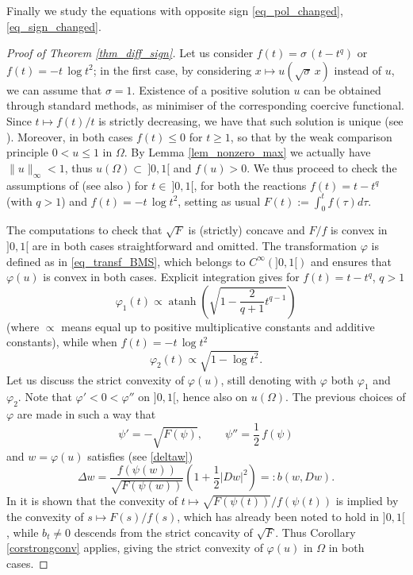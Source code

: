 \documentclass[12pt]{amsart}
\numberwithin{equation}{section}
\theoremstyle{plain}
\theoremstyle{plain}
\theoremstyle{plain}
\theoremstyle{definition}
\begin{document}
Finally we study the equations with opposite sign \eqref{eq_pol_changed}, \eqref{eq_sign_changed}.
\begin{proof}[Proof of Theorem \ref{thm_diff_sign}]
Let us consider $f(t) = \sigma\, (t-t^q)$ or $f(t)=-t \, \log t^2$; in the first case, by considering $x\mapsto u(\sqrt{\sigma}\, x)$ instead of $u$, we can assume that $\sigma=1$. 
Existence of a positive solution $u$ can be obtained through standard methods, as minimiser of the corresponding coercive functional. Since $t \mapsto f(t)/t$ is strictly decreasing, we have that such solution is unique (see \cite{BrOs86}). 
Moreover, in both cases $f(t) \leq 0$ for $t\geq 1$, so that by the weak comparison principle $0<u\leq 1$ in $\Omega$. 
By Lemma \ref{lem_nonzero_max} we actually have $\|u\|_\infty <1$, thus $u(\Omega) \subset \ ]0, 1[$ and $f(u)>0$. 
 We thus proceed to check the assumptions of \cite{BMS22} (see also \cite{MRS24}) for $t \in\ ]0,1[$, for both the reactions $f(t)=t-t^q$ (with $q>1$) and $f(t)=-t\, \log t^2$, setting as usual $ F(t) := \int_0^t f(\tau) d \tau.$

The computations to check that $\sqrt{F}$ is (strictly) concave and $F/f$ is convex in $]0,1[$ are in both cases straightforward and omitted.
The transformation $\varphi$ is defined as in \eqref{eq_transf_BMS}, which belongs to $C^\infty( ]0, 1[)$ and \cite[Theorem 1.2]{BMS22} ensures that $\varphi(u)$ is convex in both cases. Explicit integration gives for $f(t)=t-t^q$, $q>1$
$$\varphi_1(t) \propto \operatorname{atanh}\left(\sqrt{1-\frac{2}{q+1} t^{q-1}}\right) $$
(where $\propto$ means equal up to positive multiplicative constants and additive constants), while when $f(t)=-t\, \log t^2$ 
$$\varphi_2(t) \propto \sqrt{1-\log t^2}. $$
Let us discuss the strict convexity of $\varphi(u)$, still denoting with $\varphi$ both $\varphi_1$ and $\varphi_2$.
Note that $\varphi'<0<\varphi''$ on $]0, 1[$, hence also on $u(\Omega)$.
The previous choices of $\varphi$ are made in such a way that 
\[
\psi' =-\sqrt{F(\psi)}, \qquad \psi'' = \frac{1}{2} \, f(\psi)
\]
and $w=\varphi(u)$ satisfies (see \eqref{deltaw})
$$\Delta w=\frac{f(\psi(w))}{\sqrt{F(\psi(w))}}\left(1+ \frac{1}{2}|Dw|^2\right) =: b(w, Dw).$$
In \cite[page 95]{BMS22} it is shown that the convexity of $t\mapsto \sqrt{F(\psi(t))}/f(\psi(t))$ is implied by 
the convexity of $s\mapsto F(s)/f(s)$, which has already been noted to hold in $]0, 1[$, while $b_t\neq 0$ descends from the strict concavity of $\sqrt{F}$. 
Thus Corollary \ref{corstrongconv} applies, giving the strict convexity of $\varphi(u)$ in $\Omega$ in both cases.
\end{proof}
\end{document}
